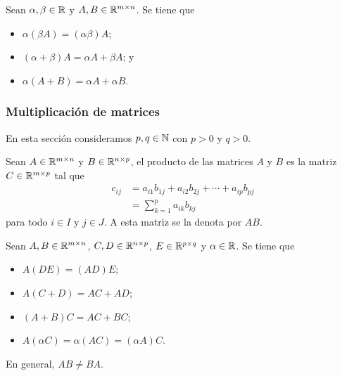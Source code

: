 \documentclass[a4,11pt]{aleph-notas}
\begin{document}
\begin{teo}
    Sean $\alpha,\beta \in \R$ y $A,B\in\Mat[\R]{m}{n}$. Se tiene que
    \begin{itemize}
    \item 
        $\alpha(\beta A) = (\alpha\beta)A$;
    \item 
        $(\alpha+\beta)A = \alpha A + \beta A$; y
    \item 
        $\alpha(A+B) = \alpha A + \alpha B$.
    \end{itemize}
\end{teo}


\subsubsection{Multiplicación de matrices}

En esta sección consideramos  $p,q\in \N$ con $p>0$ y $q>0$.

\begin{defi}
    Sean $A \in \Mat[\R]{m}{n}$ y $B \in \Mat[\R]{n}{p}$, el producto de las matrices $A$ y $B$ es la matriz $C \in \Mat[\R]{m}{p}$ tal que
    \begin{align*}
        c_{ij} & = a_{i1}b_{1j} + a_{i2} b_{2j} + \cdots + a_{ip}b_{pj} \\
               & = \sum_{k=1}^p a_{ik} b_{kj}
    \end{align*}
    para todo $i \in I$ y $j \in J$. A esta matriz se la denota por $AB$.
\end{defi}



\begin{teo}
    Sean $A, B\in \R^{m \times n}$, $C,D\in \R^{n \times p}$, $E\in \R^{p \times q}$ y $\alpha \in\R$. Se tiene que
    \begin{itemize}
    \item 
        $A(DE) = (AD)E$;
    \item 
        $A(C+D) = AC + AD$; 
    \item 
        $(A+B)C = AC + BC$; 
    
    \item 
        $A(\alpha C) = \alpha (AC) = (\alpha A) C$.
    \end{itemize}
\end{teo}

\begin{advertencia}
    En general, $AB\neq BA$.
\end{advertencia}
\end{document}
